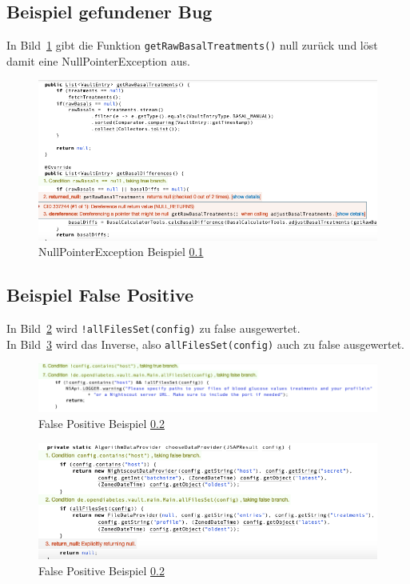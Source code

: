 \documentclass[accentcolor=tud0b,12pt,paper=a4]{tudreport}
\begin{document}
\subsection{Beispiel gefundener Bug}
\label{sec:coverity_bug}
In Bild~\ref{fig:coverity_bug} gibt die Funktion \texttt{getRawBasalTreatments()} null zurück und löst damit eine NullPointerException aus.

\begin{figure}[h]
\includegraphics[width=1.0\textwidth]{Coverity_Bug}
\caption{NullPointerException Beispiel \ref{sec:coverity_bug}}
\centering
\label{fig:coverity_bug}
\end{figure}

\subsection{Beispiel False Positive}
\label{sec:coverity_fp}
In Bild~\ref{fig:coverity_fp1} wird \texttt{!allFilesSet(config)} zu false ausgewertet.
\\
In Bild~\ref{fig:coverity_fp2} wird das Inverse, also \texttt{allFilesSet(config)} auch zu false ausgewertet.

\begin{figure}[h]
\includegraphics[width=1.0\textwidth]{Coverity_FP1}
\caption{False Positive Beispiel \ref{sec:coverity_fp}}
\centering
\label{fig:coverity_fp1}
\end{figure}

\begin{figure}[h]
\includegraphics[width=1.0\textwidth]{Coverity_FP2}
\caption{False Positive Beispiel \ref{sec:coverity_fp}}
\centering
\label{fig:coverity_fp2}
\end{figure}
\end{document}
